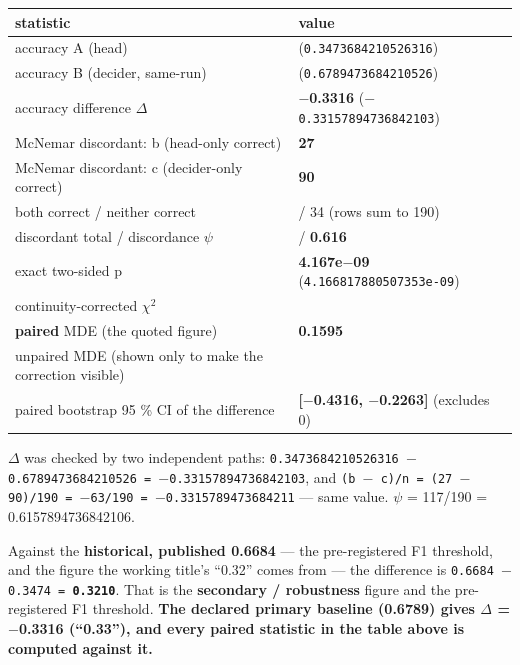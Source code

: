 \documentclass[11pt,a4paper]{article}
\begin{document}
\begin{center}
\begin{tabular}{@{}>{\raggedright\arraybackslash}p{}>{\raggedright\arraybackslash}p{}@{}}
\hline
\textbf{statistic} & \textbf{value} \\ \hline
accuracy A (head) & 0.3474 (\texttt{0.3473684210526316}) \\ \hline
accuracy B (decider, same-run) & 0.6789 (\texttt{0.6789473684210526}) \\ \hline
accuracy difference $\Delta$ & \textbf{$-$0.3316} (\texttt{$-$0.33157894736842103}) \\ \hline
McNemar discordant: b (head-only correct) & \textbf{27} \\ \hline
McNemar discordant: c (decider-only correct) & \textbf{90} \\ \hline
both correct / neither correct & 39 / 34 (rows sum to 190) \\ \hline
discordant total / discordance $\psi$ & 117 / \textbf{0.616} \\ \hline
exact two-sided p & \textbf{4.167e$-$09} (\texttt{4.166817880507353e-09}) \\ \hline
continuity-corrected $\chi$$^{2}$ & 32.85 \\ \hline
\textbf{paired} MDE (the quoted figure) & \textbf{0.1595} \\ \hline
unpaired MDE (shown only to make the correction visible) & 0.1355 \\ \hline
paired bootstrap 95 \% CI of the difference & \textbf{[$-$0.4316, $-$0.2263]} (excludes 0) \\ \hline
\end{tabular}
\end{center}

$\Delta$ was checked by two independent paths: \texttt{0.3473684210526316 $-$ 0.6789473684210526 = $-$0.33157894736842103}, and \texttt{(b $-$ c)/n = (27 $-$ 90)/190 = $-$63/190 = $-$0.3315789473684211} --- same value. $\psi$ = 117/190 = 0.6157894736842106.

Against the \textbf{historical, published 0.6684} --- the pre-registered F1 threshold, and the figure the working title's ``0.32'' comes from --- the difference is \texttt{0.6684 $-$ 0.3474 = \textbf{0.3210}}. That is the \textbf{secondary / robustness} figure and the pre-registered F1 threshold. \textbf{The declared primary baseline (0.6789) gives $\Delta$ = $-$0.3316 (``0.33''), and every paired statistic in the table above is computed against it.}
\end{document}
